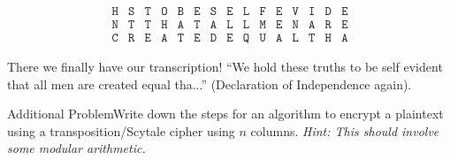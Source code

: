 {\begin{enumerate}
\begin{center}
\[\begin{array}{ccccccccccccccc}
    \texttt{H} & \texttt{S} & \texttt{T} & \texttt{O} & \texttt{B} & \texttt{E} & \texttt{S} & \texttt{E} & \texttt{L} & \texttt{F} & \texttt{E} & \texttt{V} & \texttt{I} & \texttt{D} & \texttt{E} \\
    
    \texttt{N} & \texttt{T} & \texttt{T} & \texttt{H} & \texttt{A} & \texttt{T} & \texttt{A} & \texttt{L} & \texttt{L} & \texttt{M} & \texttt{E} & \texttt{N} & \texttt{A} & \texttt{R} & \texttt{E} \\
    
    \texttt{C} & \texttt{R} & \texttt{E} & \texttt{A} & \texttt{T} & \texttt{E} & \texttt{D} & \texttt{E} & \texttt{Q} & \texttt{U} & \texttt{A} & \texttt{L} & \texttt{T} & \texttt{H} & \texttt{A}
    \end{array}
    \]
    \vspace*{-1cm}
    \end{center}
    There we finally have our transcription! ``We hold these truths to be self evident that all men are created equal tha...'' (Declaration of Independence again).
\end{enumerate}
}

\begin{exercise}
    {Additional Problem}Write down the steps for an algorithm to encrypt a plaintext using a transposition/Scytale cipher using $n$ columns. \textit{Hint: This should involve some modular arithmetic.} 
\end{exercise}

